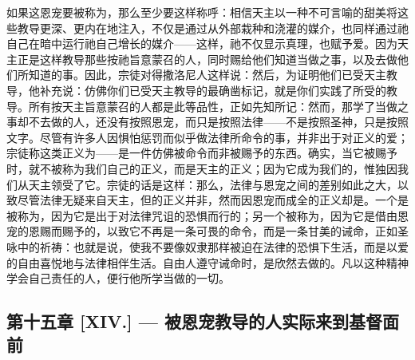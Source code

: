 如果这恩宠要被称为，那么至少要这样称呼：相信天主以一种不可言喻的甜美将这些教导更深、更内在地注入，不仅是通过从外部栽种和浇灌的媒介，也同样通过祂自己在暗中运行祂自己增长的媒介——这样，祂不仅显示真理，也赋予爱。因为天主正是这样教导那些按祂旨意蒙召的人，同时赐给他们知道当做之事，以及去做他们所知道的事。因此，宗徒对得撒洛尼人这样说：然后，为证明他们已受天主教导，他补充说：仿佛你们已受天主教导的最确凿标记，就是你们实践了所受的教导。所有按天主旨意蒙召的人都是此等品性，正如先知所记：然而，那学了当做之事却不去做的人，还没有按照恩宠，而只是按照法律——不是按照圣神，只是按照文字。尽管有许多人因惧怕惩罚而似乎做法律所命令的事，并非出于对正义的爱；宗徒称这类正义为——是一件仿佛被命令而非被赐予的东西。确实，当它被赐予时，就不被称为我们自己的正义，而是天主的正义；因为它成为我们的，惟独因我们从天主领受了它。宗徒的话是这样：那么，法律与恩宠之间的差别如此之大，以致尽管法律无疑来自天主，但的正义并非，然而因恩宠而成全的正义却是。一个是被称为，因为它是出于对法律咒诅的恐惧而行的；另一个被称为，因为它是借由恩宠的恩赐而赐予的，以致它不再是一条可畏的命令，而是一条甘美的诫命，正如圣咏中的祈祷：也就是说，使我不要像奴隶那样被迫在法律的恐惧下生活，而是以爱的自由喜悦地与法律相伴生活。自由人遵守诫命时，是欣然去做的。凡以这种精神学会自己责任的人，便行他所学当做的一切。\par


\subsection{第十五章 [XIV.] — 被恩宠教导的人实际来到基督面前}

